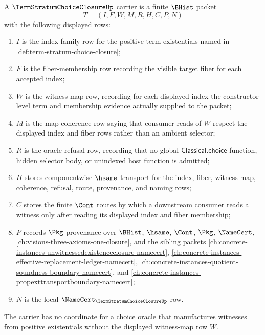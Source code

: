 \begin{definition}
\label{def:term-stratum-choice-closure-carrier}
A $\TermStratumChoiceClosureUp$ carrier is a finite $\BHist$ packet
$$
T=(I,F,W,M,R,H,C,P,N)
$$
with the following displayed rows:
\begin{enumerate}
\item $I$ is the index-family row for the positive term existentials named in \autoref{def:term-stratum-choice-closure};
\item $F$ is the fiber-membership row recording the visible target fiber for each accepted index;
\item $W$ is the witness-map row, recording for each displayed index the constructor-level term and membership evidence actually supplied to the packet;
\item $M$ is the map-coherence row saying that consumer reads of $W$ respect the displayed index and fiber rows rather than an ambient selector;
\item $R$ is the oracle-refusal row, recording that no global $\mathsf{Classical.choice}$ function, hidden selector body, or unindexed host function is admitted;
\item $H$ stores componentwise $\hsame$ transport for the index, fiber, witness-map, coherence, refusal, route, provenance, and naming rows;
\item $C$ stores the finite $\Cont$ routes by which a downstream consumer reads a witness only after reading its displayed index and fiber membership;
\item $P$ records $\Pkg$ provenance over $\BHist$, $\hsame$, $\Cont$, $\Pkg$, $\NameCert$, \autoref{ch:visions-three-axioms-one-closure}, and the sibling packets \autoref{ch:concrete-instances-unwitnessedexistenceclosure-namecert}, \autoref{ch:concrete-instances-effective-replacement-ledger-namecert}, \autoref{ch:concrete-instances-quotient-soundness-boundary-namecert}, and \autoref{ch:concrete-instances-propexttransportboundary-namecert};
\item $N$ is the local $\NameCert_{\TermStratumChoiceClosureUp}$ row.
\end{enumerate}
The carrier has no coordinate for a choice oracle that manufactures witnesses from positive existentials without the displayed witness-map row $W$.
\end{definition}

